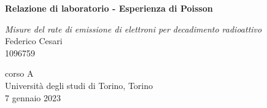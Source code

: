 \begin{titlepage}
   \begin{center}
       \vspace*{1cm}
        
       \textbf{\LARGE Relazione di laboratorio - Esperienza di Poisson}
       
       \vspace{0.3cm}
       \large \textit{Misure del rate di emissione di elettroni per decadimento radioattivo} \\
       
       \vspace{0.5cm}
       \Large Federico Cesari \\
       
       \small 1096759

			
		\vspace{1cm}
		\begin{center}
			
		\end{center}
		
		

       \vfill
            
       
            
       \vspace{0.8cm}
     
       
            
       corso A\\
       Università degli studi di Torino, Torino\\
       7 gennaio 2023\\
       
            
   \end{center}
\end{titlepage}
